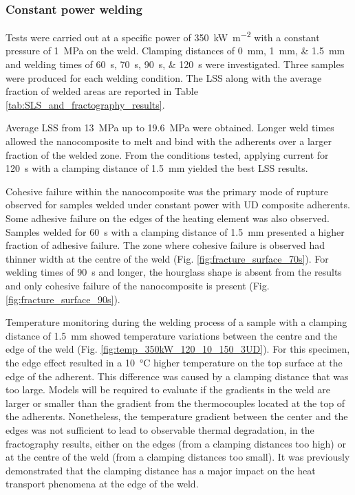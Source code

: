 \documentclass[11pt,review,times]{elsarticle}
\begin{document}
\subsubsection{Constant power welding}

Tests were carried out at a specific power of \SI{350}{\kW\per\square\metre} with a constant pressure of \SI{1}{\MPa} on the weld. 
Clamping distances of \SIlist{0;1;1.5}{\mm} and welding times of \SIlist{60;70;90;120}{\s} were investigated. 
Three samples were produced for each welding condition. 
The LSS along with the average fraction of welded areas are reported in Table \ref{tab:SLS_and_fractography_results}. 

Average LSS from \SI{13}{\MPa} up to \SI{19.6}{\MPa} were obtained. 
Longer weld times allowed the nanocomposite to melt and bind with the adherents over a larger fraction of the welded zone. 
From the conditions tested, applying current for \SI{120}{\s} with a clamping distance of \SI{1.5}{\mm} yielded the best LSS results. 

Cohesive failure within the nanocomposite was the primary mode of rupture observed for samples welded under constant power with UD composite adherents.
Some adhesive failure on the edges of the heating element was also observed. 
Samples welded for \SI{60}{\s} with a clamping distance of \SI{1.5}{\mm} presented a higher fraction of adhesive failure. 
The zone where cohesive failure is observed had thinner width at the centre of the weld (Fig. \ref{fig:fracture_surface_70s}). 
For welding times of \SI{90}{\s} and longer, the hourglass shape is absent from the results and only cohesive failure of the nanocomposite is present (Fig. \ref{fig:fracture_surface_90s}). 

Temperature monitoring during the welding process of a sample with a clamping distance of \SI{1.5}{\mm} showed temperature variations between the centre and the edge of the weld (Fig. \ref{fig:temp_350kW_120_10_150_3UD}).
For this specimen, the edge effect resulted in a \SI{10}{\celsius} higher temperature on the top surface at the edge of the adherent. 
This difference was caused by a clamping distance that was too large. 
Models will be required to evaluate if the gradients in the weld are larger or smaller than the gradient from the thermocouples located at the top of the adherents. 
Nonetheless, the temperature gradient between the center and the edges was not sufficient to lead to observable thermal degradation, in the fractography results, either on the edges (from a clamping distances too high) or at the centre of the weld (from a clamping distances too small). 
It was previously demonstrated that the clamping distance has a major impact on the heat transport phenomena at the edge of the weld. 
\end{document}
